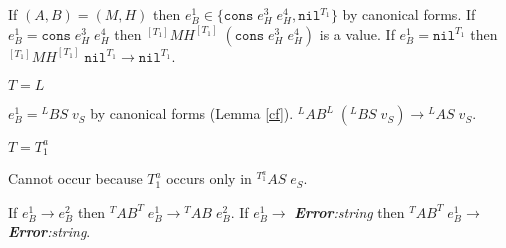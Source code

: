\begin{case}
\begin{subcase}
If $(A,B)=(M,H)$ then $e_{B}^{1}\in\lbrace\mathtt{cons}\;e_{H}^{3}\;e_{H}^{4},\mathtt{nil}^{T_{1}}\rbrace$ by canonical forms.  If $e_{B}^{1}=\mathtt{cons}\;e_{H}^{3}\;e_{H}^{4}$ then $^{[T_{1}]}MH^{[T_{1}]}\;(\mathtt{cons}\;e_{H}^{3}\;e_{H}^{4})$ is a value.  If $e_{B}^{1}=\mathtt{nil}^{T_{1}}$ then $^{[T_{1}]}MH^{[T_{1}]}\;\mathtt{nil}^{T_{1}}\rightarrow\mathtt{nil}^{T_{1}}$.
\end{subcase}
\begin{subcase}
$T=L$

$e_{B}^{1}={^{L}B}S\;v_{S}$ by canonical forms (Lemma \ref{cf}).  $^{L}AB^{L}\;(^{L}BS\;v_{S})\rightarrow{^{L}A}S\;v_{S}$.
\end{subcase}
\begin{subcase}
$T=T_{1}^{a}$

Cannot occur because $T_{1}^{a}$ occurs only in $^{T_{1}^{a}}AS\;e_{S}$.
\end{subcase}
If $e_{B}^{1}\rightarrow e_{B}^{2}$ then $^{T}AB^{T}\;e_{B}^{1}\rightarrow{^{T}A}B\;e_{B}^{2}$.  If $e_{B}^{1}\rightarrow$ \emph{\textbf{Error}:\;string} then $^{T}AB^{T}\;e_{B}^{1}\rightarrow$ \emph{\textbf{Error}:\;string}.
\end{case}